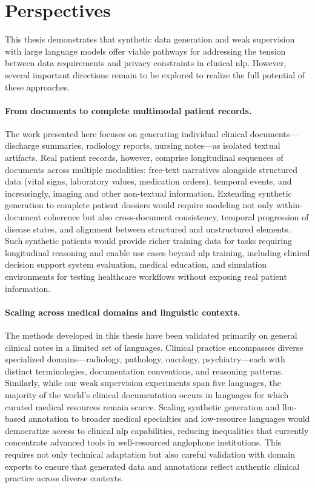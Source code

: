 \section{Perspectives}

This thesis demonstrates that synthetic data generation and weak supervision with large language models offer viable pathways for addressing the tension between data requirements and privacy constraints in clinical \gls{nlp}.
However, several important directions remain to be explored to realize the full potential of these approaches.

\paragraph{From documents to complete multimodal patient records.}
The work presented here focuses on generating individual clinical documents—discharge summaries, radiology reports, nursing notes—as isolated textual artifacts.
Real patient records, however, comprise longitudinal sequences of documents across multiple modalities: free-text narratives alongside structured data (vital signs, laboratory values, medication orders), temporal events, and increasingly, imaging and other non-textual information.
Extending synthetic generation to complete patient dossiers would require modeling not only within-document coherence but also cross-document consistency, temporal progression of disease states, and alignment between structured and unstructured elements.
Such synthetic patients would provide richer training data for tasks requiring longitudinal reasoning and enable use cases beyond \gls{nlp} training, including clinical decision support system evaluation, medical education, and simulation environments for testing healthcare workflows without exposing real patient information.

\paragraph{Scaling across medical domains and linguistic contexts.}
The methods developed in this thesis have been validated primarily on general clinical notes in a limited set of languages.
Clinical practice encompasses diverse specialized domains—radiology, pathology, oncology, psychiatry—each with distinct terminologies, documentation conventions, and reasoning patterns.
Similarly, while our weak supervision experiments span five languages, the majority of the world's clinical documentation occurs in languages for which curated medical resources remain scarce.
Scaling synthetic generation and \gls{llm}-based annotation to broader medical specialties and low-resource languages would democratize access to clinical \gls{nlp} capabilities, reducing inequalities that currently concentrate advanced tools in well-resourced anglophone institutions.
This requires not only technical adaptation but also careful validation with domain experts to ensure that generated data and annotations reflect authentic clinical practice across diverse contexts.

